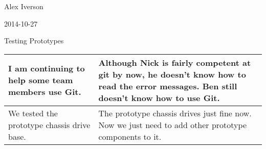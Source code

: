 Alex Iverson

2014-10-27

Testing Prototypes

\begin{tabular}{|p{5cm}|p{5cm}|}
 \hline
 I am continuing to help some team members use Git.&
 Although Nick is fairly competent at git by now, he doesn't know how to read the error messages. Ben still doesn't know how to use Git.\\
 \hline
 We tested the prototype chassis drive base.&
 The prototype chassis drives just fine now. Now we just need to add other prototype components to it.\\
 \hline
\end{tabular}
